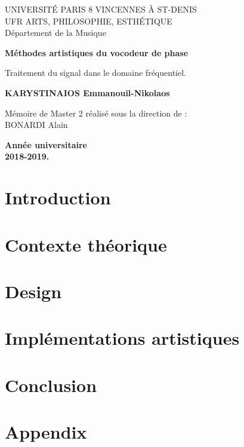 \documentclass[a4paper,12pt,twoside]{report}
\author{KARYSTINAIOS Emmanouil Nikolaos}
\begin{document}
    
% 
\begin{titlepage}
    \begin{center}
        UNIVERSITÉ PARIS 8 VINCENNES À ST-DENIS \\
        UFR ARTS, PHILOSOPHIE, ESTHÉTIQUE \\
        Département de la Musique
        \vspace*{7cm}
        
        \textbf{\Large{Méthodes artistiques du vocodeur de phase}}
      

        \vspace{0.5cm}
        Traitement du signal dans le domaine fréquentiel.

        
        \vspace{3cm}
        
        \textbf{KARYSTINAIOS Emmanouil-Nikolaos}
        
        \vspace{4cm}    

        Mémoire de Master 2 réalisé sous la direction de : \\
        BONARDI Alain 

        \vspace{3cm}
        
        \textbf{Année universitaire \\ 2018-2019.}
        
        
        
        
        
    \end{center}
\end{titlepage}
\preface


\body
\chapter{Introduction}

\chapter{Contexte théorique}

\chapter{Design}

\chapter{Implémentations artistiques}

\chapter{Conclusion}

\appendix
\chapter{Appendix}

\lstlistoflistings 




\end{document}
